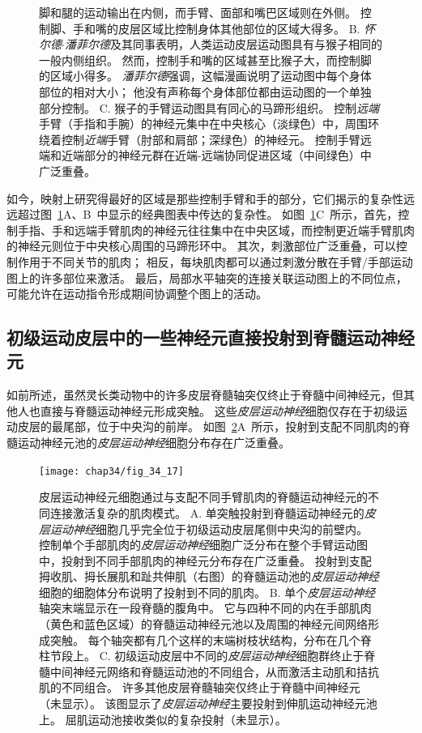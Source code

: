 \begin{figure}[htbp]
{		脚和腿的运动输出在内侧，而手臂、面部和嘴巴区域则在外侧。
		控制脚、手和嘴的皮层区域比控制身体其他部位的区域大得多。
		B. \textit{怀尔德$\cdot$潘菲尔德}及其同事表明，人类运动皮层运动图具有与猴子相同的一般内侧组织。
		然而，控制手和嘴的区域甚至比猴子大，而控制脚的区域小得多。
		\textit{潘菲尔德}强调，这幅漫画说明了运动图中每个身体部位的相对大小；
		他没有声称每个身体部位都由运动图的一个单独部分控制。
		C. 猴子的手臂运动图具有同心的马蹄形组织。
		控制\textit{远端}手臂（手指和手腕）的神经元集中在中央核心（淡绿色）中，周围环绕着控制\textit{近端}手臂（肘部和肩部；深绿色）的神经元。
		控制手臂远端和近端部分的神经元群在近端-远端协同促进区域（中间绿色）中广泛重叠\cite{park2001consistent}。}
	\label{fig:34_16}
\end{figure}


如今，映射上研究得最好的区域是那些控制手臂和手的部分，它们揭示的复杂性远远超过图~\ref{fig:34_16}A、B~中显示的经典图表中传达的复杂性。
如图~\ref{fig:34_16}C~所示，首先，控制手指、手和远端手臂肌肉的神经元往往集中在中央区域，而控制更近端手臂肌肉的神经元则位于中央核心周围的马蹄形环中。
其次，刺激部位广泛重叠，可以控制作用于不同关节的肌肉；
相反，每块肌肉都可以通过刺激分散在手臂/手部运动图上的许多部位来激活。
最后，局部水平轴突的连接关联运动图上的不同位点，可能允许在运动指令形成期间协调整个图上的活动。



\subsection{初级运动皮层中的一些神经元直接投射到脊髓运动神经元}

如前所述，虽然灵长类动物中的许多皮层脊髓轴突仅终止于脊髓中间神经元，但其他人也直接与脊髓运动神经元形成突触。
这些\textit{皮层运动神经}细胞仅存在于初级运动皮层的最尾部，位于中央沟的前岸。
如图~\ref{fig:34_17}A~所示，投射到支配不同肌肉的脊髓运动神经元池的\textit{皮层运动神经}细胞分布存在广泛重叠。


\begin{figure}[htbp]
	\centering
	\texttt{[image: chap34/fig\_34\_17]}
	\caption{皮层运动神经元细胞通过与支配不同手臂肌肉的脊髓运动神经元的不同连接激活复杂的肌肉模式。
		A. 单突触投射到脊髓运动神经元的\textit{皮层运动神经}细胞几乎完全位于初级运动皮层尾侧中央沟的前壁内。
		控制单个手部肌肉的\textit{皮层运动神经}细胞广泛分布在整个手臂运动图中，投射到不同手部肌肉的神经元分布存在广泛重叠。
		投射到支配拇收肌、拇长展肌和趾共伸肌（右图）的脊髓运动池的\textit{皮层运动神经}细胞的细胞体分布说明了投射到不同的肌肉\cite{rathelot2006muscle}。
		B. 单个\textit{皮层运动神经}轴突末端显示在一段脊髓的腹角中。
		它与四种不同的内在手部肌肉（黄色和蓝色区域）的脊髓运动神经元池以及周围的神经元间网络形成突触。
		每个轴突都有几个这样的末端树枝状结构，分布在几个脊柱节段上\cite{shinoda1981divergent}。
		C. 初级运动皮层中不同的\textit{皮层运动神经}细胞群终止于脊髓中间神经元网络和脊髓运动池的不同组合，从而激活主动肌和拮抗肌的不同组合。
		许多其他皮层脊髓轴突仅终止于脊髓中间神经元（未显示）。
		该图显示了\textit{皮层运动神经}主要投射到伸肌运动神经元池上。
		屈肌运动池接收类似的复杂投射（未显示）\cite{cheney1985patterns}。}
	\label{fig:34_17}
\end{figure}


